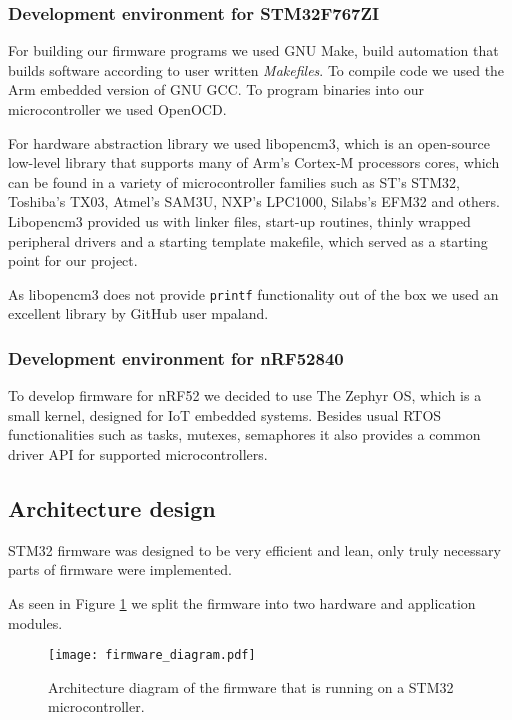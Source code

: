 \subsubsection{ Development environment for STM32F767ZI}

For building our firmware programs we used GNU Make, build automation that builds software according to user written \textit{Makefiles}.
To compile code we used the Arm embedded version of GNU GCC.
To program binaries into our microcontroller we used OpenOCD.

For hardware abstraction library we used libopencm3, which is an open-source low-level library that supports many of Arm's Cortex-M processors cores, which can be found in a variety of microcontroller families such as ST's STM32, Toshiba's TX03, Atmel's SAM3U, NXP's LPC1000, Silabs's EFM32 and others.
Libopencm3 provided us with linker files, start-up routines, thinly wrapped peripheral drivers and a starting template makefile, which served as a starting point for our project.

As libopencm3 does not provide \verb|printf| functionality out of the box we used an excellent library by GitHub user mpaland\cite{printf_lib}.


\subsubsection{ Development environment for nRF52840}

To develop firmware for nRF52 we decided to use The Zephyr OS, which is a small kernel, designed for IoT embedded systems.
Besides usual RTOS functionalities such as tasks, mutexes, semaphores it also provides a common driver API for supported microcontrollers.


\subsection{ Architecture design}

STM32 firmware was designed to be very efficient and lean, only truly necessary parts of firmware were implemented.

As seen in Figure \ref{firmware_diagram} we split the firmware into two hardware and application modules.
\newline
\begin{figure}[ht]
        \centering
        \texttt{[image: firmware\_diagram.pdf]} 
        \caption{ Architecture diagram of the firmware that is running on a STM32 microcontroller.} 
        \label{firmware_diagram}
\end{figure}

